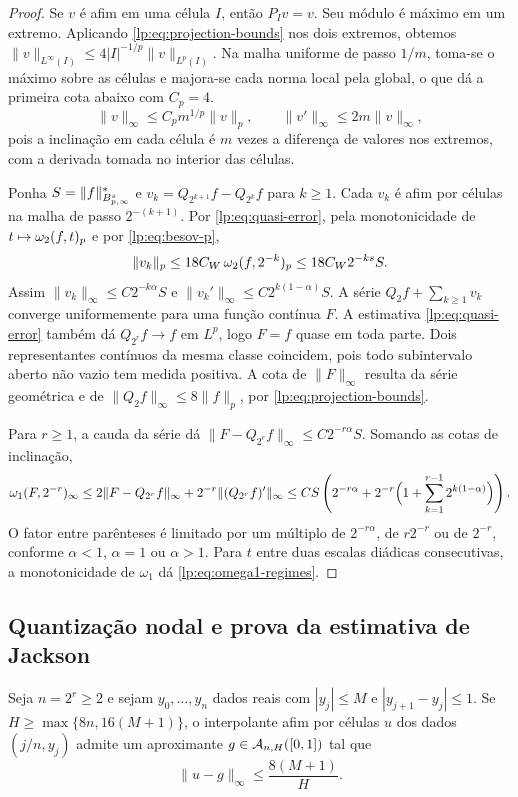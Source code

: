 \documentclass[12pt,a4paper]{article}
\begin{document}
\begin{proof}
Se $v$ é afim em uma célula $I$, então $P_Iv=v$. Seu módulo é máximo em um extremo. Aplicando \eqref{lp:eq:projection-bounds} nos dois extremos, obtemos $\|v\|_{L^\infty(I)}\le4|I|^{-1/p}\|v\|_{L^p(I)}$. Na malha uniforme de passo $1/m$, toma-se o máximo sobre as células e majora-se cada norma local pela global, o que dá a primeira cota abaixo com $C_p=4$.
\begin{equation}
 \|v\|_\infty\le C_p m^{1/p}\|v\|_p,\qquad \|v'\|_\infty\le2m\|v\|_\infty,
 \label{lp:eq:nikolskii}
\end{equation}
pois a inclinação em cada célula é $m$ vezes a diferença de valores nos extremos, com a derivada tomada no interior das células.

Ponha $S=\|f\|^*_{B^{s}_{p,\infty}}$ e $v_k=Q_{2^{k+1}}f-Q_{2^k}f$ para $k\ge1$. Cada $v_k$ é afim por células na malha de passo $2^{-(k+1)}$. Por \eqref{lp:eq:quasi-error}, pela monotonicidade de $t\mapsto\omega_2(f,t)_{p}$ e por \eqref{lp:eq:besov-p},
\[
 \|v_k\|_p\le18C_W\,\omega_2(f,2^{-k})_{p}\le18C_W 2^{-ks}S.
\]
Assim $\|v_k\|_\infty\le C2^{-k\alpha}S$ e $\|v_k'\|_\infty\le C2^{k(1-\alpha)}S$. A série $Q_2f+\sum_{k\ge1}v_k$ converge uniformemente para uma função contínua $F$. A estimativa \eqref{lp:eq:quasi-error} também dá $Q_{2^r}f\to f$ em $L^p$, logo $F=f$ quase em toda parte. Dois representantes contínuos da mesma classe coincidem, pois todo subintervalo aberto não vazio tem medida positiva. A cota de $\|F\|_\infty$ resulta da série geométrica e de $\|Q_2f\|_\infty\le8\|f\|_p$, por \eqref{lp:eq:projection-bounds}.

Para $r\ge1$, a cauda da série dá $\|F-Q_{2^r}f\|_\infty\le C2^{-r\alpha}S$. Somando as cotas de inclinação,
\[
 \omega_1(F,2^{-r})_\infty
 \le 2\|F-Q_{2^r}f\|_\infty+2^{-r}\|(Q_{2^r}f)'\|_\infty
 \le CS\left(2^{-r\alpha}+2^{-r}\Bigl(1+\sum_{k=1}^{r-1}2^{k(1-\alpha)}\Bigr)\right).
\]
O fator entre parênteses é limitado por um múltiplo de $2^{-r\alpha}$, de $r2^{-r}$ ou de $2^{-r}$, conforme $\alpha<1$, $\alpha=1$ ou $\alpha>1$. Para $t$ entre duas escalas diádicas consecutivas, a monotonicidade de $\omega_1$ dá \eqref{lp:eq:omega1-regimes}.
\end{proof}

\subsection{Quantização nodal e prova da estimativa de Jackson}

\begin{lema}
\label{lp:prop:jackson-proof}
Seja $n=2^r\ge2$ e sejam $y_0,\ldots,y_n$ dados reais com $|y_j|\le M$ e $|y_{j+1}-y_j|\le1$. Se $H\ge\max\{8n,16(M+1)\}$, o interpolante afim por células $u$ dos dados $(j/n,y_j)$ admite um aproximante $g\in\mathcal A_{n,H}([0,1])$ tal que
\[
 \|u-g\|_\infty\le\frac{8(M+1)}{H}.
\]
\end{lema}
\end{document}
